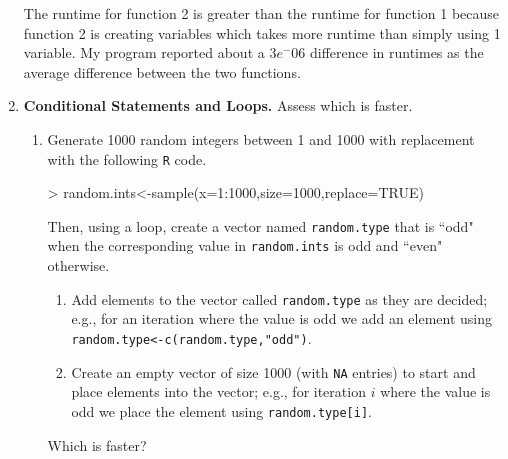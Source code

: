 \documentclass{article}
\begin{document}
\begin{enumerate}
The runtime for function 2 is greater than the runtime for function 1 because function 2 is creating variables which takes more runtime than simply using 1 variable. My program reported about a $3e^-06$ difference in runtimes as the average difference between the two functions.
\newpage
  \item \textbf{Conditional Statements and Loops.} Assess which is faster.
  \begin{enumerate}
    \item Generate 1000 random integers between 1 and 1000 with replacement with
    the following \texttt{R} code.
\begin{Schunk}
\begin{Sinput}
> random.ints<-sample(x=1:1000,size=1000,replace=TRUE)
\end{Sinput}
\end{Schunk}
    Then, using a loop, create a vector named \texttt{random.type} that is ``odd"
    when the corresponding value in \texttt{random.ints} is odd and ``even" otherwise.
    \begin{enumerate}
      \item Add elements to the vector called \texttt{random.type} as they
      are decided; e.g., for an iteration where the value is odd we add
      an element using \texttt{random.type<-c(random.type,"odd")}.
      \item Create an empty vector of size 1000 (with \texttt{NA} entries) to 
      start and place elements into the vector; e.g., for iteration $i$
      where the value is odd we place the element using \texttt{random.type[i]}.
    \end{enumerate}
    Which is faster?
\end{enumerate}


\end{enumerate}
\end{document}
